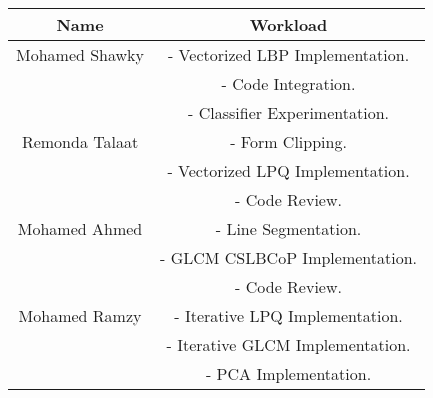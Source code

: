 \begin{center}
\begin{tabular}{||c |c ||} 
 \hline
 Name & Workload \\ [0.5ex] 
 \hline\hline
  Mohamed Shawky & - Vectorized LBP Implementation. \\
  & - Code Integration. \\
  & - Classifier Experimentation. \\
 \hline
 Remonda Talaat & - Form Clipping. \\
 & - Vectorized LPQ Implementation. \\
 & - Code Review. \\
  \hline
 Mohamed Ahmed & - Line Segmentation. \\
 & - GLCM CSLBCoP Implementation. \\
 & - Code Review. \\
 \hline
 Mohamed Ramzy & - Iterative LPQ Implementation. \\ 
 & - Iterative GLCM Implementation. \\
 & - PCA Implementation. \\ [1ex] 
 \hline
\end{tabular}
\end{center}